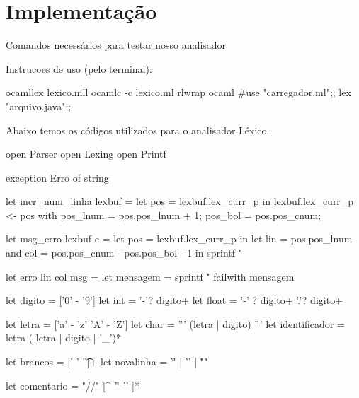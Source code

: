 \documentclass[12pt,a4paper,twoside]{report}
\begin{document}
\section{Implementação}
Comandos necessários para testar nosso analisador
\begin{terminal}
 Instrucoes de uso (pelo terminal):

   ocamllex lexico.mll
   ocamlc -c lexico.ml
   rlwrap ocaml
   #use "carregador.ml";;
   lex "arquivo.java";;

\end{terminal}
Abaixo temos os códigos utilizados para o analisador Léxico.
\begin{terminal}
{
  open Parser
  open Lexing
  open Printf

  exception Erro of string

  let incr_num_linha lexbuf = 
    let pos = lexbuf.lex_curr_p in
     lexbuf.lex_curr_p <- { pos with
        pos_lnum = pos.pos_lnum + 1;
        pos_bol = pos.pos_cnum;
     }
 
  let msg_erro lexbuf c =
    let pos = lexbuf.lex_curr_p in
    let lin = pos.pos_lnum
    and col = pos.pos_cnum - pos.pos_bol - 1 in
    sprintf "%

  let erro lin col msg =
    let mensagem = sprintf "%
       failwith mensagem


}

let digito = ['0' - '9']
let int = '-'? digito+
let float = '-' ? digito+ '.'? digito+

let letra = ['a' - 'z' 'A' - 'Z']
let char = ''' (letra | digito) '''
let identificador = letra ( letra | digito | '_')*

let brancos = [' ' '\t']+
let novalinha = '\r' | '\n' | "\r\n"

let comentario = "//" [^ '\r' '\n' ]*


\end{terminal}
\end{document}
